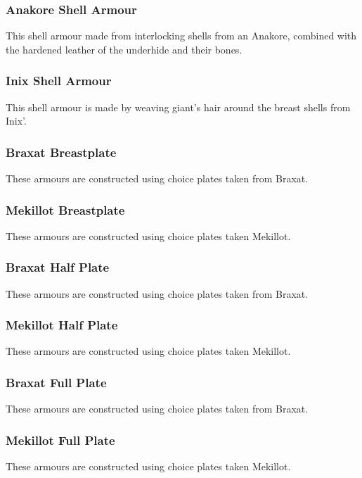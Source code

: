 \begin{multicols}{2}
\subsubsection{Anakore Shell Armour}
\label{itmamr:anakoreshell}
This shell armour made from interlocking shells from an Anakore, combined with the hardened leather of the underhide and their bones.

\subsubsection{Inix Shell Armour}
\label{itmamr:inixshell}
This shell armour is made by weaving giant's hair around the breast shells from Inix'.

\subsubsection{Braxat Breastplate}
\label{itmamr:braxatbreastplate}
These armours are constructed using choice plates taken from Braxat.

\subsubsection{Mekillot Breastplate}
\label{itmamr:mekillotbreastplate}
These armours are constructed using choice plates taken Mekillot.

\subsubsection{Braxat Half Plate}
\label{itmamr:braxathalfplate}
These armours are constructed using choice plates taken from Braxat.

\subsubsection{Mekillot Half Plate}
\label{itmamr:mekillothalfplate}
These armours are constructed using choice plates taken Mekillot.

\subsubsection{Braxat Full Plate}
\label{itmamr:braxatfullplate}
These armours are constructed using choice plates taken from Braxat.

\subsubsection{Mekillot Full Plate}
\label{itmamr:mekillotfullplate}
These armours are constructed using choice plates taken Mekillot.

\end{multicols}
